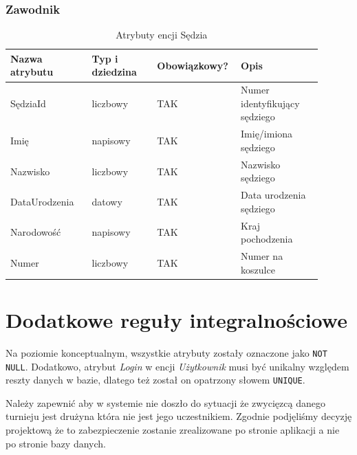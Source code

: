 \documentclass{mwrep}
\begin{document}
\subsubsection{Zawodnik}
\begin{table}[H]
	\begin{tabular}{|p{0.25\linewidth}|p{0.2\linewidth}|p{0.2\linewidth}|p{0.25\linewidth}|}
	\hline
	Nazwa atrybutu & Typ i dziedzina & Obowiązkowy? & Opis                                                           \\ \hline
	SędziaId   & liczbowy                            & TAK                              & Numer identyfikujący sędziego                                                   \\ \hline
	Imię         & napisowy                           & TAK                              & Imię/imiona sędziego        \\ \hline
	Nazwisko	   & liczbowy							& TAK								& Nazwisko sędziego \\  \hline
	DataUrodzenia          & datowy                           & TAK                              & Data urodzenia sędziego              \\ \hline
	Narodowość           & napisowy                            & TAK                              & Kraj pochodzenia   \\ \hline
	Numer           & liczbowy                            & TAK                              & Numer na koszulce   \\ \hline
	\end{tabular}
	\caption{Atrybuty encji Sędzia}
\end{table}

\section{Dodatkowe reguły integralnościowe}

Na poziomie konceptualnym, wszystkie atrybuty zostały oznaczone jako \texttt{NOT NULL}. Dodatkowo, atrybut \emph{Login} w encji
\emph{Użytkownik} musi być unikalny względem reszty danych w bazie, dlatego też został on opatrzony słowem \texttt{UNIQUE}.

Należy zapewnić aby w systemie nie doszło do sytuacji że zwycięzcą danego turnieju jest drużyna która nie jest jego uczestnikiem.
Zgodnie podjęliśmy decyzję projektową że to zabezpieczenie zostanie zrealizowane po stronie aplikacji a nie po stronie bazy danych.

\vspace{1cm}
\end{document}
